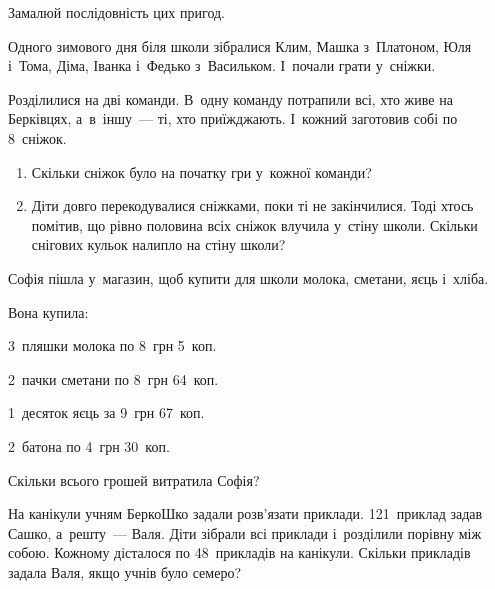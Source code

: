 Замалюй послідовність цих пригод.


\problem
Одного зимового дня біля школи зібралися Клим, Машка з~Платоном, Юля і~Тома,
Діма, Іванка і~Федько з~Васильком. І~почали грати у~сніжки.

Розділилися на дві команди. В~одну команду потрапили всі,
хто живе на Берківцях, а~в~іншу~--- ті, хто приїжджають.
І~кожний заготовив собі по 8~сніжок.

\begin{enumerate}
    \item Скільки сніжок було на початку гри у~кожної команди?
    \item Діти довго перекодувалися сніжками, поки ті не закінчилися.
    Тоді хтось помітив, що рівно половина всіх сніжок влучила у~стіну школи.
    Скільки снігових кульок налипло на стіну школи?
\end{enumerate}


\problem
Софія пішла у~магазин, щоб купити для школи молока, сметани, яєць і~хліба.

Вона купила:

3~пляшки молока по 8~грн 5~коп.

2~пачки сметани по 8~грн 64~коп.

1~десяток яєць за 9~грн 67~коп.

2~батона по 4~грн 30~коп.

Скільки всього грошей витратила Софія?


\problem
На канікули учням БеркоШко задали розв'язати приклади.
121~приклад задав Сашко, а~решту~--- Валя.
Діти зібрали всі приклади і~розділили порівну між собою.
Кожному дісталося по 48~прикладів на канікули.
Скільки прикладів задала Валя, якщо учнів було семеро?


